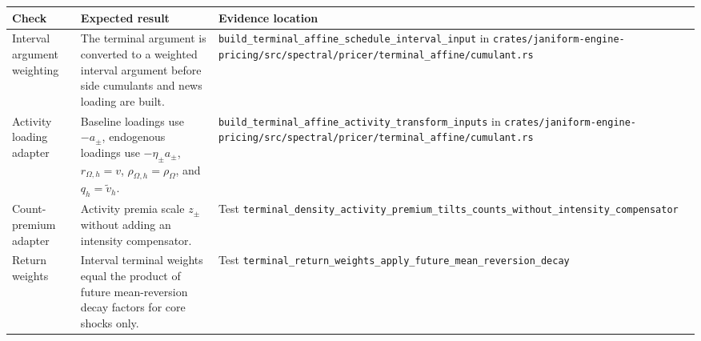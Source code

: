 \documentclass[11pt]{article}
\begin{document}
\begin{tabularx}{\textwidth}{XXX}
\toprule
Check & Expected result & Evidence location\\
\midrule
Interval argument weighting
& The terminal argument is converted to a weighted interval argument before side cumulants and news loading are built.
& \texttt{build\_terminal\_affine\_schedule\_interval\_input} in \texttt{crates/janiform-engine-pricing/src/spectral/pricer/terminal\_affine/cumulant.rs}\\
Activity loading adapter
& Baseline loadings use \(-a_\pm\), endogenous loadings use \(-\eta_\pm a_\pm\), \(r_{\Omega,h}=v\), \(\rho_{\Omega,h}=\rho_\Omega\), and \(q_h=\tilde v_h\).
& \texttt{build\_terminal\_affine\_activity\_transform\_inputs} in \texttt{crates/janiform-engine-pricing/src/spectral/pricer/terminal\_affine/cumulant.rs}\\
Count-premium adapter
& Activity premia scale \(z_\pm\) without adding an intensity compensator.
& Test \texttt{terminal\_density\_activity\_premium\_tilts\_counts\_without\_intensity\_compensator}\\
Return weights
& Interval terminal weights equal the product of future mean-reversion decay factors for core shocks only.
& Test \texttt{terminal\_return\_weights\_apply\_future\_mean\_reversion\_decay}\\
\bottomrule
\end{tabularx}
\end{document}
